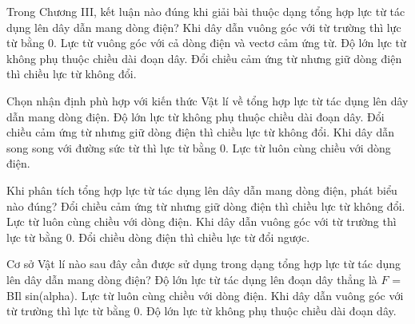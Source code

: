 \begin{ex}
Trong Chương III, kết luận nào đúng khi giải bài thuộc dạng tổng hợp lực từ tác dụng lên dây dẫn mang dòng điện?
\choice
{Khi dây dẫn vuông góc với từ trường thì lực từ bằng 0.}
{\True Lực từ vuông góc với cả dòng điện và vectơ cảm ứng từ.}
{Độ lớn lực từ không phụ thuộc chiều dài đoạn dây.}
{Đổi chiều cảm ứng từ nhưng giữ dòng điện thì chiều lực từ không đổi.}
\end{ex}

\begin{ex}
Chọn nhận định phù hợp với kiến thức Vật lí về tổng hợp lực từ tác dụng lên dây dẫn mang dòng điện.
\choice
{Độ lớn lực từ không phụ thuộc chiều dài đoạn dây.}
{Đổi chiều cảm ứng từ nhưng giữ dòng điện thì chiều lực từ không đổi.}
{\True Khi dây dẫn song song với đường sức từ thì lực từ bằng 0.}
{Lực từ luôn cùng chiều với dòng điện.}
\end{ex}

\begin{ex}
Khi phân tích tổng hợp lực từ tác dụng lên dây dẫn mang dòng điện, phát biểu nào đúng?
\choice
{Đổi chiều cảm ứng từ nhưng giữ dòng điện thì chiều lực từ không đổi.}
{Lực từ luôn cùng chiều với dòng điện.}
{Khi dây dẫn vuông góc với từ trường thì lực từ bằng 0.}
{\True Đổi chiều dòng điện thì chiều lực từ đổi ngược.}
\end{ex}

\begin{ex}
Cơ sở Vật lí nào sau đây cần được sử dụng trong dạng tổng hợp lực từ tác dụng lên dây dẫn mang dòng điện?
\choice
{\True Độ lớn lực từ tác dụng lên đoạn dây thẳng là $F$ = BIl sin(alpha).}
{Lực từ luôn cùng chiều với dòng điện.}
{Khi dây dẫn vuông góc với từ trường thì lực từ bằng 0.}
{Độ lớn lực từ không phụ thuộc chiều dài đoạn dây.}
\end{ex}

